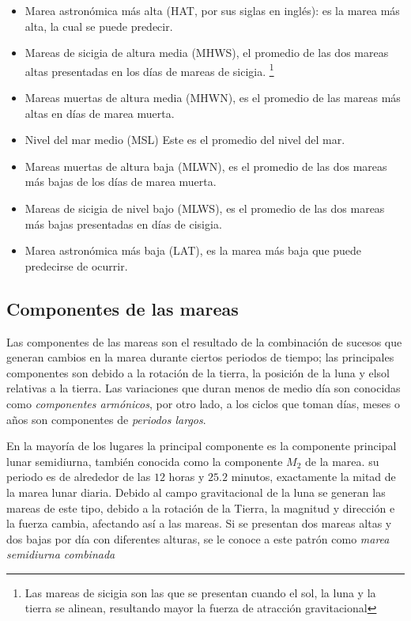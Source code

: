 \begin{itemize}
\item Marea astronómica más alta (HAT, por sus siglas en inglés): es la marea más alta, la cual se puede predecir.
\item Mareas de sicigia de altura media (MHWS), el promedio de las dos mareas altas presentadas en los días de mareas de sicigia. \footnotesize\footnote{Las mareas de sicigia son las que se presentan cuando el sol, la luna y la tierra se alinean, resultando mayor la fuerza de atracción gravitacional}
\item Mareas muertas de altura media (MHWN), es el promedio de las mareas más altas en días de marea muerta.
\item Nivel del mar medio (MSL) Este es el promedio del nivel del mar.
\item Mareas muertas de altura baja (MLWN), es el promedio de las dos mareas más bajas de los días de marea muerta.
\item Mareas de sicigia de nivel bajo (MLWS), es el promedio de las dos mareas más bajas presentadas en días de cisigia.
\item Marea astronómica más baja (LAT), es la marea más baja que puede predecirse de ocurrir.
\end{itemize}

\subsection{Componentes de las mareas}
Las componentes de las mareas son el resultado de la combinación de sucesos que generan cambios en la marea durante ciertos periodos de tiempo; las principales componentes son debido a la rotación de la tierra, la posición de la luna y elsol relativas a la tierra. Las variaciones que duran menos de medio día son conocidas como \textit{componentes armónicos}, por otro lado, a los ciclos que toman días, meses o años son componentes de \textit{periodos largos}.

En la mayoría de los lugares la principal componente es la componente principal lunar semidiurna, también conocida como la componente $M_2$ de la marea. su periodo es de alrededor de las $12$ horas y $25.2$ minutos, exactamente la mitad de la marea lunar diaria. Debido al campo gravitacional de la luna se generan las mareas de este tipo, debido a la rotación de la Tierra, la magnitud y dirección e la fuerza cambia, afectando así a las mareas. Si se presentan dos mareas altas  y dos bajas por día con diferentes alturas, se le conoce a este patrón como \textit{marea semidiurna combinada}


